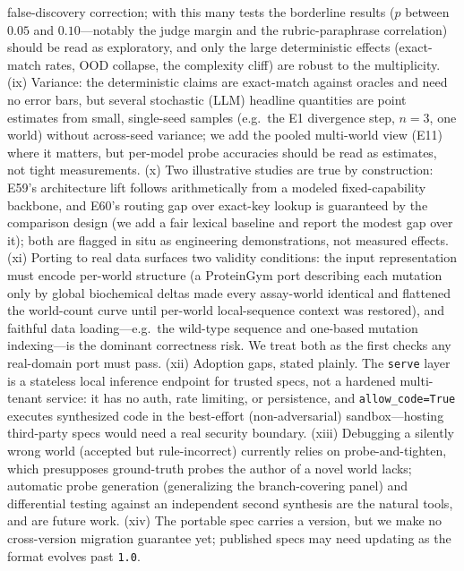 \documentclass[11pt]{article}
\begin{document}
false-discovery correction; with this many tests the borderline results
($p$ between $0.05$ and $0.10$---notably the judge margin and the
rubric-paraphrase correlation) should be read as exploratory, and only the
large deterministic effects (exact-match rates, OOD collapse, the complexity
cliff) are robust to the multiplicity. (ix) Variance: the deterministic claims
are exact-match against oracles and need no error bars, but several
stochastic (LLM) headline quantities are point estimates from small,
single-seed samples (e.g.\ the E1 divergence step, $n{=}3$, one world) without
across-seed variance; we add the pooled multi-world view (E11) where it
matters, but per-model probe accuracies should be read as estimates, not tight
measurements. (x) Two illustrative studies are true by construction:
E59's architecture lift follows arithmetically from a modeled fixed-capability
backbone, and E60's routing gap over exact-key lookup is guaranteed by the
comparison design (we add a fair lexical baseline and report the modest gap over
it); both are flagged in situ as engineering demonstrations, not measured effects.
(xi) Porting to real data surfaces two validity conditions: the input representation must
encode per-world structure (a ProteinGym port describing each mutation only by global
biochemical deltas made every assay-world identical and flattened the world-count curve until
per-world local-sequence context was restored), and faithful data loading---e.g.\ the wild-type
sequence and one-based mutation indexing---is the dominant correctness risk. We treat both as the
first checks any real-domain port must pass.
(xii) Adoption gaps, stated plainly. The \texttt{serve} layer is a stateless local
inference endpoint for trusted specs, not a hardened multi-tenant service: it has no auth, rate
limiting, or persistence, and \texttt{allow\_code=True} executes synthesized code in the
best-effort (non-adversarial) sandbox---hosting third-party specs would need a real security
boundary. (xiii) Debugging a silently wrong world (accepted but rule-incorrect) currently
relies on probe-and-tighten, which presupposes ground-truth probes the author of a novel world
lacks; automatic probe generation (generalizing the branch-covering panel) and differential
testing against an independent second synthesis are the natural tools, and are future work.
(xiv) The portable spec carries a version, but we make no cross-version migration guarantee yet;
published specs may need updating as the format evolves past \texttt{1.0}.

\end{document}
